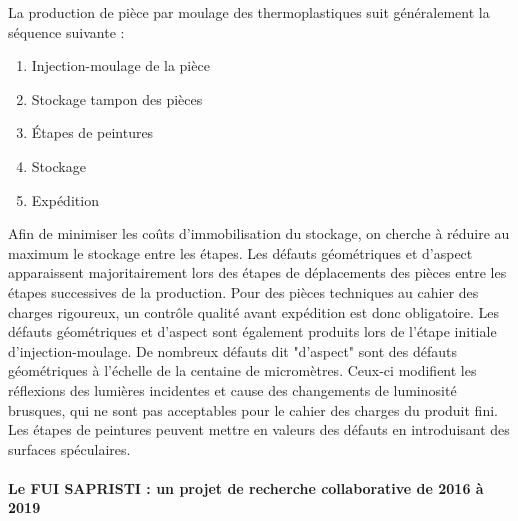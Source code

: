 \noindent
La production de pièce par moulage des thermoplastiques suit généralement la séquence suivante :
\begin{enumerate}
\item Injection-moulage de la pièce
\item Stockage tampon des pièces
\item Étapes de peintures
\item Stockage
\item Expédition
\end{enumerate}

Afin de minimiser les coûts d'immobilisation du stockage, on cherche à réduire au maximum le stockage entre les étapes.
Les défauts géométriques et d'aspect apparaissent majoritairement lors des étapes de déplacements des pièces entre les étapes successives de la production.
Pour des pièces techniques au cahier des charges rigoureux, un contrôle qualité avant expédition est donc obligatoire.
Les défauts géométriques et d'aspect sont également produits lors de l'étape initiale d'injection-moulage.
De nombreux défauts dit "d'aspect" sont des défauts géométriques à l'échelle de la centaine de micromètres.
Ceux-ci modifient les réflexions des lumières incidentes et cause des changements de luminosité brusques, qui ne sont pas acceptables pour le cahier des charges du produit fini.
Les étapes de peintures peuvent mettre en valeurs des défauts en introduisant des surfaces spéculaires.


\bigskip
\paragraph{Le FUI SAPRISTI : un projet de recherche collaborative de 2016 à 2019}\mbox{} \\

